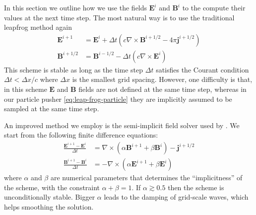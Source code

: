 In this section we outline how we use the fields $\mathbf{E}^{i}$ and
$\mathbf{B}^{i}$ to the compute their values at the next time step. The most
natural way is to use the traditional leapfrog method again
\begin{align}
  \label{eq:maxwell-leapfrog}
  \mathbf{E}^{i+1} &= \mathbf{E}^i + \Delta t (c\nabla\times \mathbf{B}^{i+1/2} - 4\pi \mathbf{j}^{i+1/2}) \\
  \mathbf{B}^{i+1/2} &= \mathbf{B}^{i-1/2} - \Delta t (c\nabla\times \mathbf{E}^i)
\end{align}
This scheme is stable as long as the time step $\Delta t$ satisfies the Courant
condition $\Delta t < \Delta x / c$ where $\Delta x$ is the smallest
grid spacing. However, one difficulty is that, in this scheme $\mathbf{E}$ and
$\mathbf{B}$ fields are not defined at the same time step, whereas in our
particle pusher \eqref{eq:leap-frog-particle} they are implicitly assumed to be
sampled at the same time step.

An improved method we employ is the semi-implicit field solver used by
\citep{haugboelle_photon-plasma:_2012}. We start from the following finite
difference equations:
\begin{align}
  \frac{\mathbf{E}^{i+1} -\mathbf{E}^{i}}{\Delta t} & = \nabla \times (
  \alpha \mathbf{B}^{i+1} + \beta \mathbf{B}^{i} ) -\mathbf{j}^{i+1/2}\\
  \frac{\mathbf{B}^{i+1} -\mathbf{B}^{i}}{\Delta t} & = - \nabla \times
  ( \alpha \mathbf{E}^{i+1} + \beta \mathbf{E}^{i} )
\end{align}
where $\alpha$ and $\beta$ are numerical parameters that determines
the ``implicitness'' of the scheme, with the constraint $\alpha +
\beta = 1$. If $\alpha \gtrsim 0.5$ then the scheme is unconditionally
stable. Bigger $\alpha$ leads to the damping of grid-scale waves,
which helps smoothing the solution.

